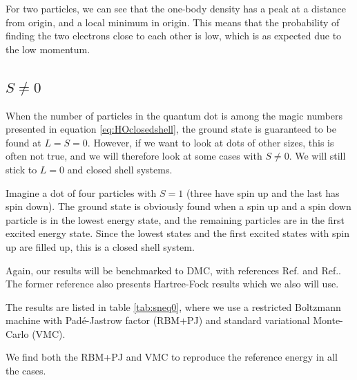 For two particles, we can see that the one-body density has a peak at a distance from origin, and a local minimum in origin. This means that the probability of finding the two electrons close to each other is low, which is as expected due to the low momentum. 

\iffalse
\subsection{$S\neq0$}
When the number of particles in the quantum dot is among the magic numbers presented in equation \eqref{eq:HOclosedshell}, the ground state is guaranteed to be found at $L=S=0$. However, if we want to look at dots of other sizes, this is often not true, and we will therefore look at some cases with $S\neq 0$. We will still stick to $L=0$ and closed shell systems.

Imagine a dot of four particles with $S=1$ (three have spin up and the last has spin down). The ground state is obviously found when a spin up and a spin down particle is in the lowest energy state, and the remaining particles are in the first excited energy state. Since the lowest states and the first excited states with spin up are filled up, this is a closed shell system.

Again, our results will be benchmarked to DMC, with references Ref.\cite{pederiva_diffusion_2000} and Ref.\cite{ghosal_incipient_2007}. The former reference also presents Hartree-Fock results which we also will use. 

The results are listed in table \eqref{tab:sneq0}, where we use a restricted Boltzmann machine with Padé-Jastrow factor (RBM+PJ) and standard variational Monte-Carlo (VMC). 

We find both the RBM+PJ and VMC to reproduce the reference energy in all the cases. 

